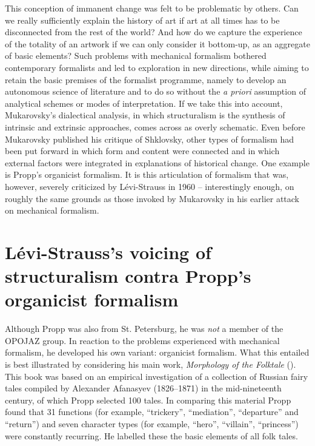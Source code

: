 \documentclass[output=paper]{langscibook}
\begin{document}
This conception of immanent change was felt to be problematic by others. Can we really sufficiently explain the history of art if art at all times has to be disconnected from the rest of the world? And how do we capture the experience of the totality of an artwork if we can only consider it bottom-up, as an aggregate of basic elements? Such problems with mechanical formalism bothered contemporary formalists and led to exploration in new directions, while aiming to retain the basic premises of the formalist programme, namely to develop an autonomous science of literature and to do so without the \emph{a priori} assumption of analytical schemes or modes of interpretation. If we take this into account, Mukarovsky's dialectical analysis, in which structuralism is the synthesis of intrinsic and extrinsic approaches, comes across as overly schematic. Even before Mukarovsky published his critique of Shklovsky, other types of formalism had been put forward in which form and content were connected and in which external factors were integrated in explanations of historical change. One example is Propp's organicist formalism. It is this articulation of formalism that was, however, severely criticized by Lévi-Strauss in 1960 -- interestingly enough, on roughly the same grounds as those invoked by Mukarovsky in his earlier attack on mechanical formalism. 

\section{Lévi-Strauss's voicing of structuralism contra Propp's organicist formalism}
\label{sec:karstens:levi-strauss}

Although Propp was also from St. Petersburg, he was \emph{not} a member of the OPOJAZ group. In reaction to the problems experienced with mechanical formalism, he developed his own variant: organicist formalism. What this entailed is best illustrated by considering his main work, \emph{Morphology of the Folktale} (\citeyear{Propp1928}). This book was based on an empirical investigation of a collection of Russian fairy tales compiled by Alexander Afanasyev (1826--1871) in the mid-nineteenth century, of which Propp selected 100 tales. In comparing this material Propp found that 31 functions (for example, ``trickery'', ``mediation'', ``departure'' and ``return'') and seven character types (for example, ``hero'', ``villain'', ``princess'') were constantly recurring. He labelled these  the basic elements of all folk tales. 
\end{document}
